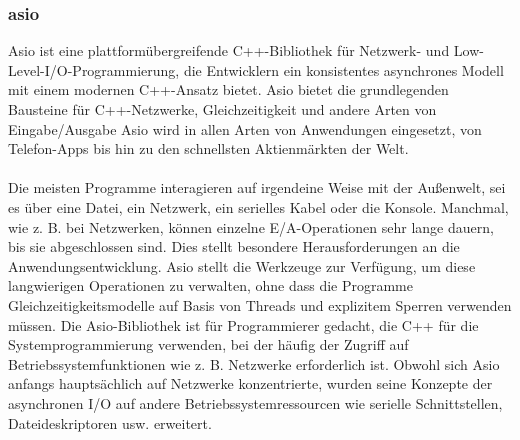\documentclass[a4paper,12pt]{article}
\begin{document}
\subsubsection{asio}
Asio ist eine plattformübergreifende C++-Bibliothek für Netzwerk- und Low-Level-I/O-Programmierung, die Entwicklern ein konsistentes asynchrones Modell mit einem modernen C++-Ansatz bietet.
Asio bietet die grundlegenden Bausteine für C++-Netzwerke, Gleichzeitigkeit und andere Arten von Eingabe/Ausgabe
Asio wird in allen Arten von Anwendungen eingesetzt, von Telefon-Apps bis hin zu den schnellsten Aktienmärkten der Welt.\\\\
Die meisten Programme interagieren auf irgendeine Weise mit der Außenwelt, sei es über eine Datei, ein Netzwerk, ein serielles Kabel oder die Konsole. Manchmal, wie z. B. bei Netzwerken, können einzelne E/A-Operationen sehr lange dauern, bis sie abgeschlossen sind. Dies stellt besondere Herausforderungen an die Anwendungsentwicklung.
Asio stellt die Werkzeuge zur Verfügung, um diese langwierigen Operationen zu verwalten, ohne dass die Programme Gleichzeitigkeitsmodelle auf Basis von Threads und explizitem Sperren verwenden müssen.
Die Asio-Bibliothek ist für Programmierer gedacht, die C++ für die Systemprogrammierung verwenden, bei der häufig der Zugriff auf Betriebssystemfunktionen wie z. B. Netzwerke erforderlich ist. Obwohl sich Asio anfangs hauptsächlich auf Netzwerke konzentrierte, wurden seine Konzepte der asynchronen I/O auf andere Betriebssystemressourcen wie serielle Schnittstellen, Dateideskriptoren usw. erweitert.
\cite{asio}
\end{document}

